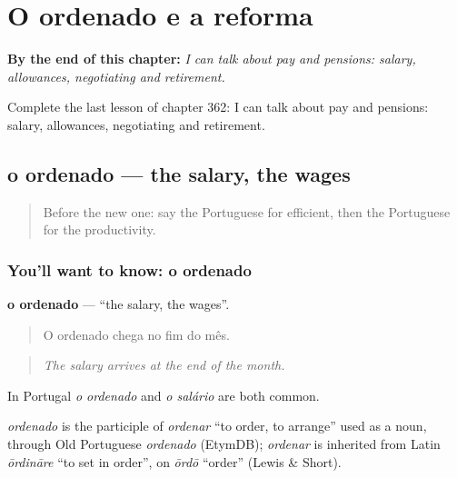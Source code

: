 
\chapter{O ordenado e a reforma}
\label{ch:pt-o-ordenado-e-a-reforma}

\begin{chapteropening}
\textbf{By the end of this chapter:} \emph{I can talk about pay and pensions: salary, allowances, negotiating and retirement.}

Complete the last lesson of chapter 362: I can talk about pay and pensions: salary, allowances, negotiating and retirement.
\end{chapteropening}

\section[o ordenado]{o ordenado — the salary, the wages}

\label{lesson:PT-C362-ordenado}



\begin{quote}
Before the new one: say the Portuguese for efficient, then the Portuguese for the productivity.
\end{quote}

\subsection*{You'll want to know: o ordenado}
\textbf{o ordenado} — \textquotedblleft{}the salary, the wages\textquotedblright{}.

\begin{quote}
O ordenado chega no fim do mês.
\end{quote}

\begin{quote}
\emph{The salary arrives at the end of the month.}
\end{quote}

In Portugal \emph{o ordenado} and \emph{o salário} are both common.

\begin{cousinweb}
\emph{ordenado} is the participle of \emph{ordenar} \textquotedblleft{}to order, to arrange\textquotedblright{} used as a noun, through Old Portuguese \emph{ordenado} (EtymDB); \emph{ordenar} is inherited from Latin \emph{ōrdināre} \textquotedblleft{}to set in order\textquotedblright{}, on \emph{ōrdō} \textquotedblleft{}order\textquotedblright{} (Lewis \& Short).
\end{cousinweb}

